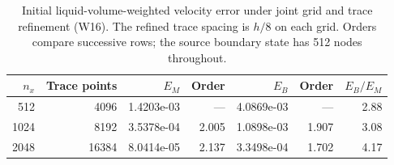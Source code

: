 \begin{table}[tbp]\centering\small
\caption{Initial liquid-volume-weighted velocity error under joint grid and trace refinement (W16). The refined trace spacing is $h/8$ on each grid. Orders compare successive rows; the source boundary state has 512 nodes throughout.}\label{tab:joint-refinement}
\begin{tabular}{@{}rrrrrrr@{}}\toprule
$n_x$ & Trace points & $E_M$ & Order & $E_B$ & Order & $E_B/E_M$\\\midrule
512 & 4096 & 1.4203e-03 & --- & 4.0869e-03 & --- & 2.88\\
1024 & 8192 & 3.5378e-04 & 2.005 & 1.0898e-03 & 1.907 & 3.08\\
2048 & 16384 & 8.0414e-05 & 2.137 & 3.3498e-04 & 1.702 & 4.17\\
\bottomrule\end{tabular}
\end{table}
